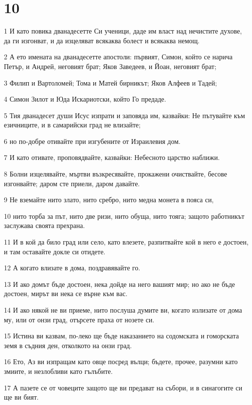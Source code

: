 \chapter{10}

\par 1 И като повика дванадесетте Си ученици, даде им власт над нечистите духове, да ги изгонват, и да изцеляват всякаква болест и всякаква немощ.
\par 2 А ето имената на дванадесетте апостоли: първият, Симон, който се нарича Петър, и Андрей, неговият брат; Яков Заведеев, и Йоан, неговият брат;
\par 3 Филип и Вартоломей; Тома и Матей бирникът; Яков Алфеев и Тадей;
\par 4 Симон Зилот и Юда Искариотски, който Го предаде.
\par 5 Тия дванадесет души Исус изпрати и заповяда им, казвайки: Не пътувайте към езичниците, и в самарийски град не влизайте;
\par 6 но по-добре отивайте при изгубените от Израилевия дом.
\par 7 И като отивате, проповядвайте, казвайки: Небесното царство наближи.
\par 8 Болни изцелявайте, мъртви възкресявайте, прокажени очиствайте, бесове изгонвайте; даром сте приели, даром давайте.
\par 9 Не вземайте нито злато, нито сребро, нито медна монета в пояса си,
\par 10 нито торба за път, нито две ризи, нито обуща, нито тояга; защото работникът заслужава своята прехрана.
\par 11 И в кой да било град или село, като влезете, разпитвайте кой в него е достоен, и там оставайте докле си отидете.
\par 12 А когато влизате в дома, поздравявайте го.
\par 13 И ако домът бъде достоен, нека дойде на него вашият мир; но ако не бъде достоен, мирът ви нека се върне към вас.
\par 14 И ако някой не ви приеме, нито послуша думите ви, когато излизате от дома му, или от онзи град, отърсете праха от нозете си.
\par 15 Истина ви казвам, по-леко ще бъде наказанието на содомската и гоморската земя в съдния ден, отколкото на онзи град.
\par 16 Ето, Аз ви изпращам като овце посред вълци; бъдете, прочее, разумни като змиите, и незлобливи като гълъбите.
\par 17 А пазете се от човеците защото ще ви предават на събори, и в синагогите си ще ви бият.
